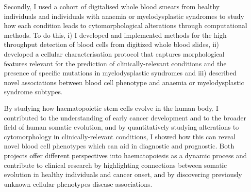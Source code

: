 Secondly, I used a cohort of digitalised whole blood smears from healthy individuals and individuals with anaemia or myelodysplastic syndromes to study how each condition leads to cytomorphological alterations through computational methods. To do this, i) I developed and implemented methods for the high-throughput detection of blood cells from digitized whole blood slides, ii) developed a cellular characterisation protocol that captures morphological features relevant for the prediction of clinically-relevant conditions and the presence of specific mutations in myelodysplastic syndromes and iii) described novel associations between blood cell phenotype and anaemia or myelodysplastic syndrome subtypes.

By studying how haematopoietic stem cells evolve in the human body, I contributed to the understanding of early cancer development and to the broader field of human somatic evolution, and by quantitatively studying alterations to cytomorphology in clinically-relevant conditions, I showed how this can reveal novel blood cell phenotypes which can aid in diagnostic and prognostic. Both projects offer different perspectives into haematopoiesis as a dynamic process and contribute to clinical research by highlighting connections between somatic evolution in healthy individuals and cancer onset, and by discovering previously unknown cellular phenotypes-disease associations.
